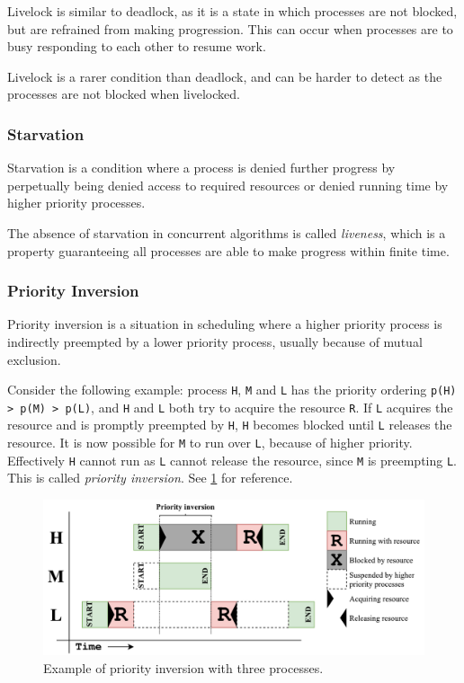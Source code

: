 Livelock is similar to deadlock, as it is a state in which processes are not blocked, but are refrained from making progression. This can occur when processes are to busy responding to each other to resume work. 

Livelock is a rarer condition than deadlock, and can be harder to detect as the processes are not blocked when livelocked. 


\subsubsection{Starvation}


Starvation is a condition where a process is denied further progress by perpetually being denied access to required resources or denied running time by higher priority processes. 

The absence of starvation in concurrent algorithms is called \textit{liveness}, which is a property guaranteeing all processes are able to make progress within finite time. 


\subsubsection{Priority Inversion}


Priority inversion is a situation in scheduling where a higher priority process is indirectly preempted by a lower priority process, usually because of mutual exclusion. 

Consider the following example: process \texttt{H}, \texttt{M} and \texttt{L} has the priority ordering \texttt{p(H) > p(M) > p(L)}, and \texttt{H} and \texttt{L} both try to acquire the resource \texttt{R}. If \texttt{L} acquires the resource and is promptly preempted by \texttt{H}, \texttt{H} becomes blocked until \texttt{L} releases the resource. It is now possible for \texttt{M} to run over \texttt{L}, because of higher priority. Effectively \texttt{H} cannot run as \texttt{L} cannot release the resource, since \texttt{M} is preempting \texttt{L}. This is called \textit{priority inversion}. See \cref{fig:priority_inversion} for reference.

\begin{figure}[h!]
    \centering
    \includegraphics[width=0.9\linewidth]{fig/priority_inversion}
    \caption{Example of priority inversion with three processes.}
    \label{fig:priority_inversion}
\end{figure}

